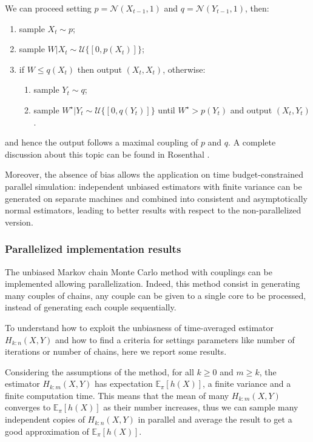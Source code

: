 \documentclass {article}
\begin{document}
We can proceed setting $p = \mathcal{N}(X_{t-1},1)$ and $q = \mathcal{N}(Y_{t-1},1)$, then:
\begin{enumerate}
	\item sample $X_t \sim p$;
	\item sample $W|X_t \sim \mathcal{U}\{[0,p(X_t)]\}$;
	\item if $W\leq q(X_t)$ then output $(X_t,X_t)$, otherwise:
	\begin{enumerate}
		\item sample $Y_t \sim q$;
		\item sample $W^\star | Y_t \sim \mathcal{U}\{[0, q(Y_t)]\}$ 
		until $W^\star > p(Y_t)$ and output $(X_t,Y_t)$.
	\end{enumerate}
\end{enumerate}
and hence the output follows a maximal coupling of $p$ and $q$. A complete discussion about this topic can be found in Rosenthal \cite{rosenthal1997faithful}.

Moreover, the absence of bias allows the application on time budget-constrained parallel simulation: independent unbiased estimators with finite variance can be generated on separate machines and combined into consistent and asymptotically normal estimators, leading to better results with respect to the non-parallelized version.

\subsubsection{Parallelized implementation results}
The unbiased Markov chain Monte Carlo method with couplings can be implemented allowing parallelization. Indeed, this method consist in generating many couples of chains, any couple can be given to a single core to be processed, instead of generating each couple sequentially.

To understand how to exploit the unbiasness of time-averaged estimator $H_{k:n}(X,Y)$ and how to find a criteria for settings parameters like number of iterations or number of chains, here we report some results.

Considering the assumptions of the method, for all $k\geq 0$ and $m \geq k$, the estimator $H_{k:m}(X,Y)$ has expectation $\mathbb{E}_\pi[h(X)]$, a finite variance and a finite computation time. This means that the mean of many $H_{k:m}(X,Y)$ converges to $\mathbb{E}_\pi[h(X)]$ as their number increases, thus we can sample many independent copies of $H_{k:n}(X,Y)$ in parallel and average the result to get a good approximation of $\mathbb{E}_\pi[h(X)]$.
\end{document}
